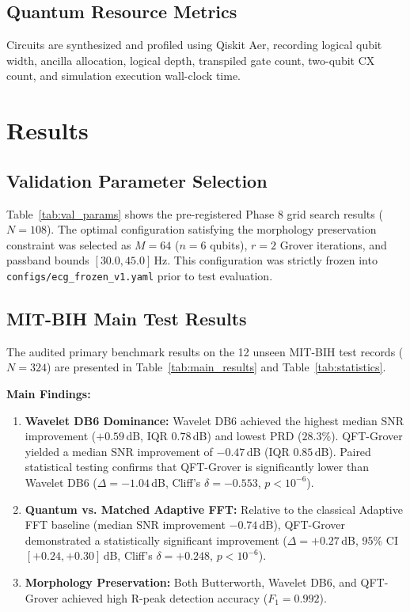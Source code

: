 \documentclass[journal,compsoc]{IEEEtran}
\begin{document}
\subsection{Quantum Resource Metrics}
Circuits are synthesized and profiled using Qiskit Aer, recording logical qubit width, ancilla allocation, logical depth, transpiled gate count, two-qubit CX count, and simulation execution wall-clock time.

\section{Results}
\subsection{Validation Parameter Selection}

Table~\ref{tab:val_params} shows the pre-registered Phase 8 grid search results ($N=108$). The optimal configuration satisfying the morphology preservation constraint was selected as $M=64$ ($n=6$ qubits), $r=2$ Grover iterations, and passband bounds $[30.0, 45.0]$\,Hz. This configuration was strictly frozen into \texttt{configs/ecg\_frozen\_v1.yaml} prior to test evaluation.

\subsection{MIT-BIH Main Test Results}



The audited primary benchmark results on the 12 unseen MIT-BIH test records ($N=324$) are presented in Table~\ref{tab:main_results} and Table~\ref{tab:statistics}. 

\textbf{Main Findings:}
\begin{enumerate}
    \item \textbf{Wavelet DB6 Dominance:} Wavelet DB6 achieved the highest median SNR improvement ($+0.59$\,dB, IQR $0.78$\,dB) and lowest PRD ($28.3\%$). QFT-Grover yielded a median SNR improvement of $-0.47$\,dB (IQR $0.85$\,dB). Paired statistical testing confirms that QFT-Grover is significantly lower than Wavelet DB6 ($\Delta = -1.04$\,dB, Cliff's $\delta = -0.553$, $p < 10^{-6}$).
    \item \textbf{Quantum vs. Matched Adaptive FFT:} Relative to the classical Adaptive FFT baseline (median SNR improvement $-0.74$\,dB), QFT-Grover demonstrated a statistically significant improvement ($\Delta = +0.27$\,dB, 95\% CI $[+0.24, +0.30]$\,dB, Cliff's $\delta = +0.248$, $p < 10^{-6}$).
    \item \textbf{Morphology Preservation:} Both Butterworth, Wavelet DB6, and QFT-Grover achieved high R-peak detection accuracy ($F_1 = 0.992$).
\end{enumerate}
\end{document}
